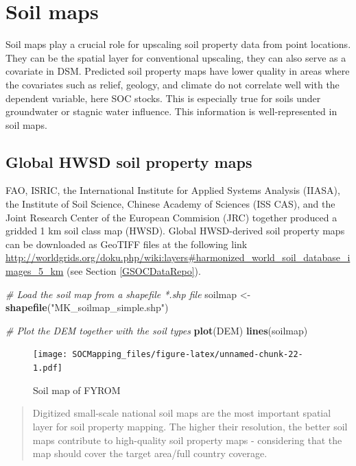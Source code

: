 \documentclass[10pt,b5paper,]{book}
\newenvironment{Shaded}{\begin{snugshade}}{\end{snugshade}}
\newcommand{\CommentTok}[1]{\textcolor[rgb]{0.56,0.35,0.01}{\textit{#1}}}
\newcommand{\KeywordTok}[1]{\textcolor[rgb]{0.13,0.29,0.53}{\textbf{#1}}}
\newcommand{\NormalTok}[1]{#1}
\newcommand{\StringTok}[1]{\textcolor[rgb]{0.31,0.60,0.02}{#1}}
\theoremstyle{definition}
\theoremstyle{definition}
\theoremstyle{definition}
\theoremstyle{remark}
\begin{document}
\hypertarget{soil-maps}{%
\section{Soil maps}\label{soil-maps}}

Soil maps play a crucial role for upscaling soil property data from
point locations. They can be the spatial layer for conventional
upscaling, they can also serve as a covariate in DSM. Predicted soil
property maps have lower quality in areas where the covariates such as
relief, geology, and climate do not correlate well with the dependent
variable, here SOC stocks. This is especially true for soils under
groundwater or stagnic water influence. This information is
well-represented in soil maps.

\hypertarget{global-hwsd-soil-property-maps}{%
\subsection{Global HWSD soil property
maps}\label{global-hwsd-soil-property-maps}}

FAO, ISRIC, the International Institute for Applied Systems Analysis
(IIASA), the Institute of Soil Science, Chinese Academy of Sciences (ISS
CAS), and the Joint Research Center of the European Commision (JRC)
together produced a gridded 1 km soil class map (HWSD). Global
HWSD-derived soil property maps can be downloaded as GeoTIFF files at
the following link
\url{http://worldgrids.org/doku.php/wiki:layers\#harmonized_world_soil_database_images_5_km}
(see Section \ref{GSOCDataRepo}).

\begin{Shaded}
\begin{Highlighting}[]
\CommentTok{# Load the soil map from a shapefile *.shp file}
\NormalTok{soilmap <-}\StringTok{ }\KeywordTok{shapefile}\NormalTok{(}\StringTok{"MK_soilmap_simple.shp"}\NormalTok{)}

\CommentTok{# Plot the DEM together with the soil types}
\KeywordTok{plot}\NormalTok{(DEM)}
\KeywordTok{lines}\NormalTok{(soilmap)}
\end{Highlighting}
\end{Shaded}

\begin{figure}
\centering
\texttt{[image: SOCMapping\_files/figure-latex/unnamed-chunk-22-1.pdf]}
\caption{\label{fig:unnamed-chunk-22}Soil map of FYROM}
\end{figure}

\begin{quote}
Digitized small-scale national soil maps are the most important spatial
layer for soil property mapping. The higher their resolution, the better
soil maps contribute to high-quality soil property maps - considering
that the map should cover the target area/full country coverage.
\end{quote}
\end{document}
